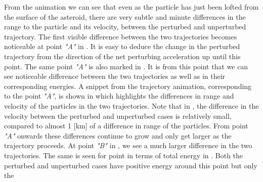 \FloatBarrier
From the animation we can see that even as the particle has just been lofted from the surface of the asteroid, there are very subtle and minute differences in the range to the particle and its velocity, between the perturbed and unperturbed trajectory. The first visible difference between the two trajectories becomes noticeable at point \textit{"A"} in . It is easy to deduce the change in the perturbed trajectory from the direction of the net perturbing acceleration up until this point. The same point \textit{"A"} is also marked in . It is from this point that we can see noticeable difference between the two trajectories as well as in their corresponding energies. A snippet from the trajectory animation, corresponding to the point \textit{"A"}, is shown in  which highlights the differences in range and velocity of the particles in the two trajectories. Note that in , the difference in the velocity between the perturbed and unperturbed cases is relatively small, compared to almost 1 [km] of a difference in range of the particles. From point \textit{"A"} onwards these differences continue to grow and only get larger as the trajectory proceeds. At point \textit{"B"} in , we see a much larger difference in the two trajectories. The same is seen for point  in terms of total energy in . Both the perturbed and unperturbed cases have positive energy around this point but only the
